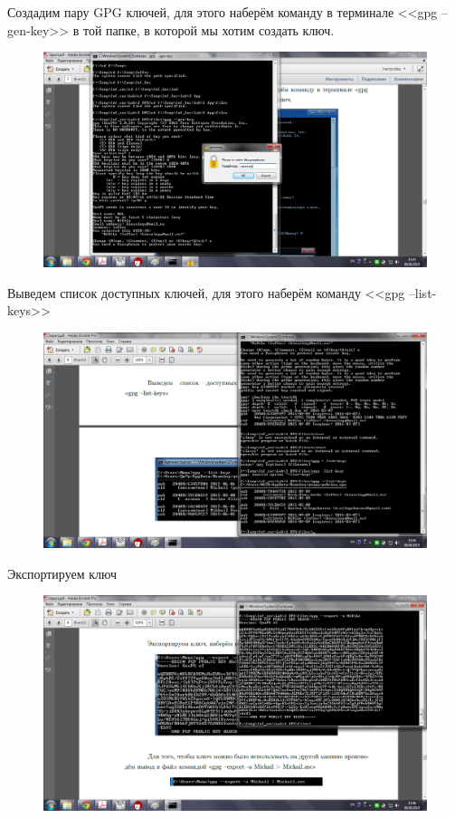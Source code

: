 \documentclass[utf8x, 12pt]{G7-32}
\begin{document}
\medskip

Создадим пару GPG ключей, для этого наберём команду в терминале <<gpg --gen-key>> в той папке, в которой мы хотим создать ключ.

\begin{figure}[hhh!]
	\begin{center}
		\includegraphics[width=12cm]{img2/281}
	\end{center}
\end{figure}	


Выведем список доступных ключей, для этого наберём команду \linebreak <<gpg --list-keys>>

\begin{figure}[hhh!]
	\begin{center}
		\includegraphics[width=12cm]{img2/282}
	\end{center}
\end{figure}	

Экспортируем ключ

\begin{figure}[hhh!]
	\begin{center}
		\includegraphics[width=12cm]{img2/283}
	\end{center}
\end{figure}	
\end{document}
